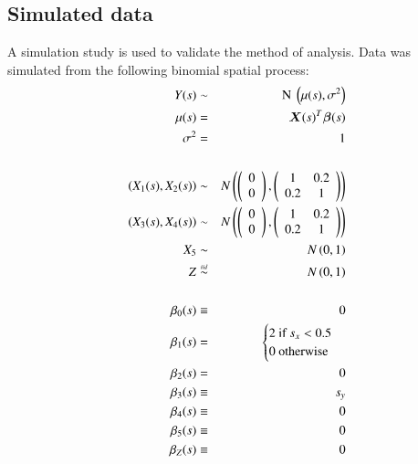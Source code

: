 \documentclass[authoryear, review, 11pt]{elsarticle}
\begin{document}
		\subsection{Simulated data}
			 A simulation study is used to validate the method of analysis. Data was simulated from the following binomial spatial process:\\
			\begin{eqnarray*}
				Y(s) &\sim& \text{ N } \left(\mu(s), \sigma^2 \right)\\
				\mu(s) &=& \bm{X}(s)^T \bm{\beta}(s)\\
				\sigma^2 &=& 1\\
				\\
				\left( X_1(s), X_2(s) \right) &\sim& N \left( \left( \begin{array}{c} 0 \\ 0 \end{array} \right), \left( \begin{array}{cc} 1 & 0.2 \\ 0.2 & 1 \end{array} \right) \right)\\
				\left( X_3(s), X_4(s) \right) &\sim& N \left( \left( \begin{array}{c} 0 \\ 0 \end{array} \right), \left( \begin{array}{cc} 1 & 0.2 \\ 0.2 & 1 \end{array} \right) \right)\\
				X_5 &\sim& N \left( 0, 1 \right)\\
				Z &\stackrel{\mathsmaller{iid}}{\sim}& N \left( 0, 1 \right)\\
				\\
				\beta_0(s) &\equiv& 0\\				
				\beta_1(s) &=& \begin{cases}  2 \text{  if } s_x < 0.5 \\ 0 \text{  otherwise}  \end{cases}\\
				\beta_2(s) &=& 0\\
				\beta_3(s) &\equiv&  s_y\\\
				\beta_4(s) &\equiv& 0\\
				\beta_5(s) &\equiv& 0\\
				\beta_Z(s) &\equiv& 0\\				
			\end{eqnarray*}
			
\end{document}
